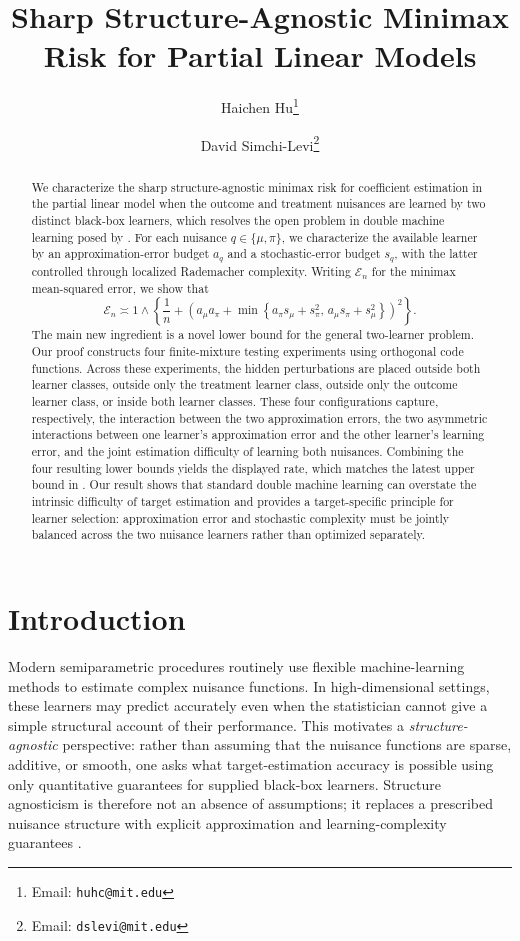 \documentclass[11pt]{article}
\title{\normalfont  Sharp Structure-Agnostic Minimax Risk for Partial Linear Models
}
\author[1,2]{Haichen Hu\thanks{{Email: \texttt{huhc@mit.edu}}}}
\author[2,3]{David Simchi-Levi\thanks{{Email: \texttt{dslevi@mit.edu}}}}
\affil[1]{Center for Computational Science and Engineering, MIT}
\affil[2]{Department of Civil and Environmental Engineering, MIT}
\affil[3]{Institute for Data, Systems, and Society, MIT}
\begin{document}
\maketitle
\singlespacing
\begin{abstract}
We characterize the sharp
structure-agnostic minimax risk for coefficient estimation in the partial
linear model when the outcome and treatment nuisances are learned by two
distinct black-box learners, which resolves the open problem in double machine learning posed by \citet{gu2025open}. For each nuisance \(q\in\{\mu,\pi\}\), we
characterize the available learner by an approximation-error budget \(a_q\)
and a stochastic-error budget \(s_q\), with the latter controlled through
localized Rademacher complexity. Writing \(\mathcal E_n\) for the minimax
mean-squared error, we show that
\[
\mathcal E_n
\asymp
1\wedge
\left\{
\frac1n+
\left(
a_\mu a_\pi+
\min\left\{
a_\pi s_\mu+s_\pi^2,\,
a_\mu s_\pi+s_\mu^2
\right\}
\right)^2
\right\}.
\]
The main new ingredient is a novel lower bound for the general two-learner problem. Our proof constructs four
finite-mixture testing experiments using orthogonal code functions. Across
these experiments, the hidden perturbations are placed outside both learner
classes, outside only the treatment learner class, outside only the outcome
learner class, or inside both learner classes. These four configurations
capture, respectively, the interaction between the two approximation errors,
the two asymmetric interactions between one learner's approximation error and
the other learner's learning error, and the joint estimation 
difficulty of learning both nuisances. Combining the four resulting lower
bounds yields the displayed rate, which matches the latest upper
bound in \citet{gu2026optimal}. Our result shows that standard
double machine learning can overstate the intrinsic difficulty of target estimation and provides a target-specific principle for learner selection:
approximation error and stochastic complexity must be jointly balanced across 
the two nuisance learners rather than optimized separately.
\end{abstract}


\section{Introduction}
\label{sec:introduction}

Modern semiparametric procedures routinely use flexible machine-learning
methods to estimate complex nuisance functions. In high-dimensional settings,
these learners may predict accurately even when the statistician cannot give a
simple structural account of their performance. This motivates a
\emph{structure-agnostic} perspective: rather than assuming that the nuisance
functions are sparse, additive, or smooth, one asks what target-estimation
accuracy is possible using only quantitative guarantees for supplied black-box
learners. Structure agnosticism is therefore not an absence of assumptions; it
replaces a prescribed nuisance structure with explicit approximation and
learning-complexity guarantees \citep{balakrishnan2026fundamental}.
\end{document}
